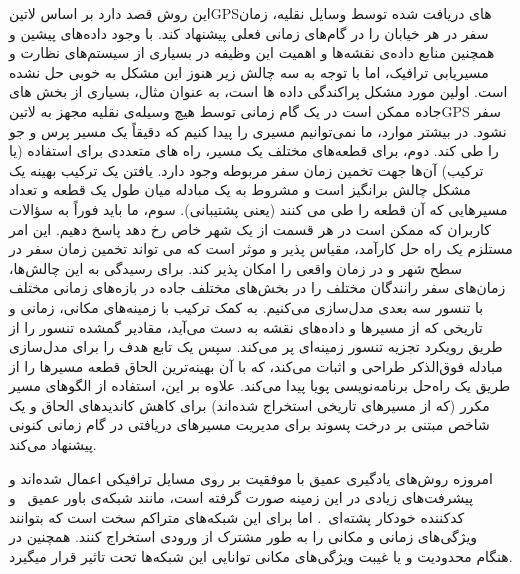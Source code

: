 این روش قصد دارد بر اساس ‌لاتین{GPS}های دریافت شده توسط وسایل نقلیه، زمان سفر در هر خیابان را در گام‌های زمانی فعلی پیشنهاد کند. با وجود داده‌های پیشین و همچنین منابع داده‌ی نقشه‌ها و اهمیت این وظیفه در بسیاری از سیستم‌های نظارت و مسیریابی ترافیک، اما با توجه به سه چالش زیر هنوز این مشکل به خوبی حل نشده است. اولین مورد مشکل پراکندگی داده ها است، به عنوان مثال، بسیاری از بخش های جاده ممکن است در یک گام زمانی توسط هیچ وسیله‌ی نقلیه مجهز به ‌لاتین{GPS} سفر نشود. در بیشتر موارد، ما نمی‌توانیم مسیری را پیدا کنیم که دقیقاً یک مسیر پرس و جو را طی کند. دوم، برای قطعه‌های مختلف یک مسیر، راه های متعددی برای استفاده (یا ترکیب) آن‌ها جهت تخمین زمان سفر مربوطه وجود دارد. یافتن یک ترکیب بهینه یک مشکل چالش برانگیز است و مشروط به یک مبادله میان طول یک قطعه و تعداد مسیرهایی که آن قطعه را طی می کنند (یعنی پشتیبانی). سوم، ما باید فوراً به سؤالات کاربران که ممکن است در هر قسمت از یک شهر خاص رخ دهد پاسخ دهیم. این امر مستلزم یک راه حل کارآمد، مقیاس پذیر و موثر است که می تواند تخمین زمان سفر در سطح شهر و در زمان واقعی را امکان پذیر کند. برای رسیدگی به این چالش‌ها، زمان‌های سفر رانندگان مختلف را در بخش‌های مختلف جاده در بازه‌های زمانی مختلف با تنسور سه بعدی مدل‌سازی می‌کنیم. به کمک ترکیب با زمینه‌های مکانی، زمانی و تاریخی که از مسیرها و داده‌های نقشه به دست می‌آید، مقادیر گمشده تنسور را از طریق رویکرد تجزیه تنسور زمینه‌ای پر می‌کند. سپس یک تابع هدف را برای مدل‌سازی مبادله فوق‌الذکر طراحی و اثبات می‌کند، که با آن بهینه‌ترین الحاق قطعه مسیرها را از طریق یک راه‌حل برنامه‌نویسی پویا پیدا می‌کند. علاوه بر این، استفاده از الگوهای مسیر مکرر (که از مسیرهای تاریخی استخراج شده‌اند) برای کاهش کاندیدهای الحاق و یک شاخص مبتنی بر درخت پسوند برای مدیریت مسیرهای دریافتی در گام زمانی کنونی پیشنهاد می‌کند.

امروزه روش‌های یادگیری عمیق با موفقیت بر روی مسايل ترافیکی اعمال شده‌اند و پیشرفت‌های زیادی در این زمینه صورت گرفته است، مانند شبکه‌ی باور عمیق~ و کدکننده خودکار پشته‌ای~.
اما برای این شبکه‌های متراکم سخت است که بتوانند ویژگی‌های زمانی و مکانی را به طور مشترک از ورودی استخراج کنند.
همچنین در هنگام محدودیت و یا غیبت ویژگی‌های مکانی توانایی این شبکه‌ها تحت تاثیر قرار میگیرد.

